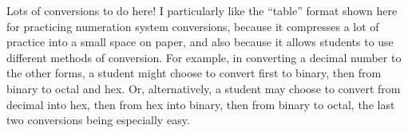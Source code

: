 
Lots of conversions to do here!  I particularly like the ``table'' format shown here for practicing numeration system conversions, because it compresses a lot of practice into a small space on paper, and also because it allows students to use different methods of conversion.  For example, in converting a decimal number to the other forms, a student might choose to convert first to binary, then from binary to octal and hex.  Or, alternatively, a student may choose to convert from decimal into hex, then from hex into binary, then from binary to octal, the last two conversions being especially easy.




